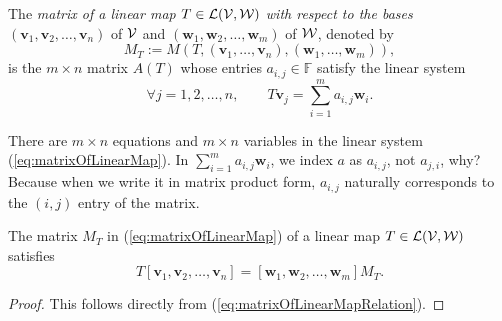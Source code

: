 \begin{defn}
  \label{def:matrixOfLinearMap}
  The \emph{matrix of a linear map
    \mbox{$T\in {\cal L}({\cal V}, {\cal W})$}
    with respect to the bases}
  $(\mathbf{v}_1, \mathbf{v}_2, \ldots, \mathbf{v}_n)$
  of ${\cal V}$
  and $(\mathbf{w}_1, \mathbf{w}_2, \ldots, \mathbf{w}_m)$
  of ${\cal W}$, denoted by
  \begin{equation}
    \label{eq:matrixOfLinearMap}
    M_T:=M(T, (\mathbf{v}_1, \ldots, \mathbf{v}_n),
    (\mathbf{w}_1, \ldots, \mathbf{w}_m)),
  \end{equation}
  is the $m\times n$ matrix $A(T)$
  whose entries $a_{i,j}\in \mathbb{F}$
  satisfy the linear system
  \begin{equation}
    \label{eq:matrixOfLinearMapRelation}
    \forall j=1,2,\ldots,n, \qquad
    T\mathbf{v}_j = \sum_{i=1}^m a_{i,j}\mathbf{w}_i.
  \end{equation}
\end{defn}

\begin{rem}
  There are $m\times n$ equations and  $m\times n$ variables
  in the linear system (\ref{eq:matrixOfLinearMap}).
  In $\sum_{i=1}^m a_{i,j}\mathbf{w}_i$,
  we index $a$ as $a_{i,j}$, not $a_{j,i}$, why?
  Because when we write it in matrix product form,
  $a_{i,j}$ naturally corresponds to the $(i,j)$ entry of the matrix.
\end{rem}

\begin{coro}
  \label{coro:matrixOfLinearMap}
  The matrix $M_T$ in (\ref{eq:matrixOfLinearMap})
  of a linear map
  \mbox{$T\in {\cal L}({\cal V}, {\cal W})$}
  satisfies
  \begin{equation}
    \label{eq:relationOfLinearMapToItsMatrix}
    T [\mathbf{v}_1, \mathbf{v}_2, \ldots, \mathbf{v}_n]
    =[\mathbf{w}_1, \mathbf{w}_2, \ldots, \mathbf{w}_m] M_T.
  \end{equation}
\end{coro}
\begin{proof}
  This follows directly from (\ref{eq:matrixOfLinearMapRelation}).
\end{proof}

